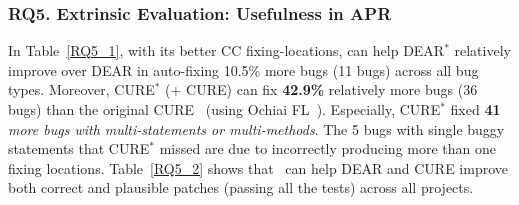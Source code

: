 \subsubsection{\bf RQ5. Extrinsic Evaluation: Usefulness in APR}
In Table~\ref{RQ5_1}, with its better CC fixing-locations, {\tool} can
help DEAR$^{*}$ relatively improve over DEAR in auto-fixing 10.5\%
more bugs (11 bugs) across all bug types. Moreover, CURE$^{*}$
({\tool}+ CURE) can fix {\bf 42.9\%} relatively more bugs (36 bugs)
than the original CURE~\cite{cure-icse21} (using Ochiai
FL~\cite{Ochiai}). Especially, CURE$^{*}$ fixed {\bf 41} {\em more bugs
with multi-statements or multi-methods}. The 5 bugs with
single buggy statements that CURE$^{*}$ missed are due to {\tool}
incorrectly producing more than one fixing locations.
Table~\ref{RQ5_2} shows that~{\tool} can help DEAR and CURE improve
both correct and plausible patches (passing all the tests) across all
projects.




